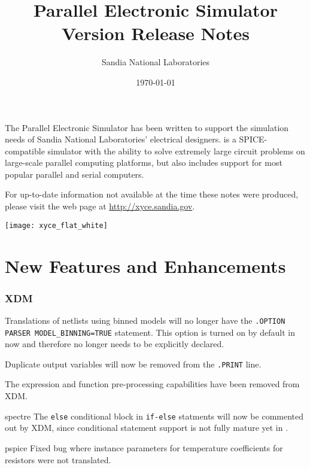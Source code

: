 \documentclass[letterpaper]{scrartcl}
\title{\XyceTitle{} Parallel Electronic Simulator\\
Version \XyceVersionVar{} Release Notes}
\author{ Sandia National Laboratories}
\date{\today}
\begin{document}
\maketitle

The \XyceTM{} Parallel Electronic Simulator has been written to support the
simulation needs of Sandia National Laboratories' electrical designers.
\XyceTM{} is a SPICE-compatible simulator with the ability to solve extremely
large circuit problems on large-scale parallel computing platforms, but also
includes support for most popular parallel and serial computers.

For up-to-date information not available at the time these notes were produced,
please visit the \XyceTM{} web page at
{\color{XyceDeepRed}\url{http://xyce.sandia.gov}}.

\tableofcontents
\vspace*{\fill}
\parbox{\textwidth}
{
  \hfill
  \texttt{[image: xyce\_flat\_white]}
}


\newpage
\section{New Features and Enhancements}

\subsubsection*{XDM}
\begin{XyceItemize}
    \item Translations of netlists using binned models will no longer
      have the \texttt{.OPTION PARSER MODEL\_BINNING=TRUE}
      statement. This option is turned on by default in \Xyce{} now
      and therefore no longer needs to be explicitly declared.
    \item Duplicate output variables will now be removed from the
      \texttt{.PRINT} line.
    \item The expression and function pre-processing capabilities have
      been removed from XDM.
    \item [spectre] The \texttt{else} conditional block in
      \texttt{if-else} statments will now be commented out by XDM,
      since conditional statement support is not fully mature yet in
      \Xyce{}.
    \item [pspice] Fixed bug where instance parameters for temperature
      coefficients for resistors were not translated.
\end{XyceItemize}
\end{document}
